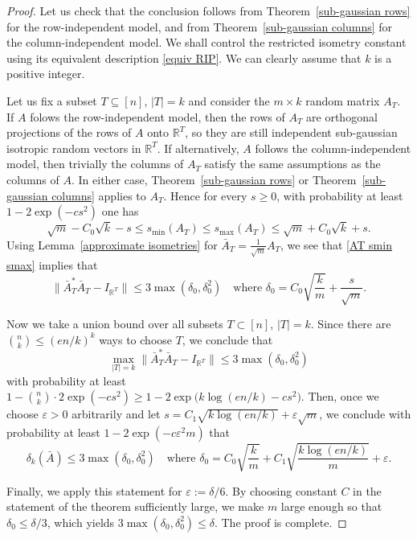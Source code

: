 \documentclass[10pt, openany]{book}
\theoremstyle{remark}
\def \R {\mathbb{R}}
\def \e {\varepsilon}
\def \d {\delta}
\def \smin {s_{\min}}
\def \smax {s_{\max}}
\begin{document}
\begin{proof}
Let us check that the conclusion follows from Theorem~\ref{sub-gaussian rows} 
for the row-independent model, and from Theorem~\ref{sub-gaussian columns} 
for the column-independent model.
We shall control the restricted isometry constant using its equivalent description \eqref{equiv RIP}.
We can clearly assume that $k$ is a positive integer.

Let us fix a subset $T \subseteq [n]$, $|T| = k$ 
and consider the $m \times k$ random matrix $A_T$. If $A$ folows
the row-independent model, then the rows of $A_T$ are orthogonal projections of the rows of
$A$ onto $\R^T$, so they are still independent sub-gaussian
isotropic random vectors in $\R^T$. If alternatively, $A$ follows the column-independent 
model, then trivially the columns of $A_T$ satisfy the same assumptions as the columns of $A$.
In either case, Theorem~\ref{sub-gaussian rows} or Theorem~\ref{sub-gaussian columns} applies
to $A_T$. Hence for every $s \ge 0$, with probability at least $1-2\exp(-cs^2)$
one has
\begin{equation}							\label{AT smin smax}
\sqrt{m} - C_0\sqrt{k} - s \le \smin(A_T) \le \smax(A_T) \le \sqrt{m} + C_0\sqrt{k} + s.
\end{equation}
Using Lemma~\ref{approximate isometries} for
$\bar{A}_T = \frac{1}{\sqrt{m}}{A_T}$, we see that \eqref{AT smin smax} implies that
$$
\| \bar{A}_T^* \bar{A}_T - I_{\R^T} \| \le 3 \max(\d_0,\d_0^2)
\quad \text{where } \d_0 = C_0 \sqrt{\frac{k}{m}} + \frac{s}{\sqrt{m}}.
$$

Now we take a union bound over all subsets $T \subset [n]$, $|T| = k$. 
Since there are $\binom{n}{k} \le (en/k)^k$ ways to choose $T$, we conclude that 
$$
\max_{|T| = k} \| \bar{A}_T^* \bar{A}_T - I_{\R^T} \| \le 3 \max(\d_0,\d_0^2)
$$
with probability at least 
$1 - \binom{n}{k} \cdot 2\exp(-cs^2) 
\ge 1 - 2 \exp \big( k \log (en/k) - cs^2)$.
Then, once we choose $\e > 0$ arbitrarily and let 
$s = C_1 \sqrt{k \log(en/k)} + \e \sqrt{m}$, 
we conclude with probability at least $1 - 2\exp(-c \e^2 m)$ that 
$$
\d_k(\bar{A}) \le 3 \max(\d_0,\d_0^2) \quad \text{where } \d_0 = C_0 \sqrt{\frac{k}{m}} + C_1 \sqrt{\frac{k \log(en/k)}{m}} + \e.
$$

Finally, we apply this statement for $\e := \d/6$. By choosing constant $C$ in the statement of the theorem sufficiently large, 
we make $m$ large enough so that $\d_0 \le \d/3$, which yields $3 \max(\d_0,\d_0^2) \le \d$. The proof is complete.
\end{proof}
\end{document}
